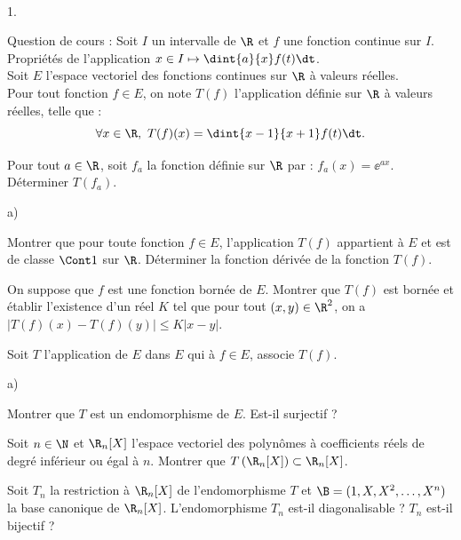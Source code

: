 \documentclass[11pt]{article}%
\begin{document}
\begin{exerciceAP}~
  \begin{noliste}{1.}
    \setlength{\itemsep}{2mm}
  \item Question de cours : Soit $I$ un intervalle de $\R$ et $f$ une
    fonction continue sur $I$.\\
    Propriétés de l'application $x \in I \mapsto \dint{a}{x} f(t)\dt$.\\
    Soit $E$ l'espace vectoriel des fonctions continues sur $\R$ à
    valeurs réelles.\\
    Pour tout fonction $f \in E$, on note $T(f)$ l'application définie
    sur $\R$ à valeurs réelles, telle que :
    \[
    \forall x\in\R, \ T(f)(x)=\dint{x-1}{x+1} f(t)\dt.
    \]
  \item Pour tout $a\in\R$, soit $f_a$ la fonction définie sur $\R$
    par : $f_a(x)=\ee^{ax}$. Déterminer $T(f_a)$.
  \item 
    \begin{noliste}{a)}
      \setlength{\itemsep}{2mm}
    \item Montrer que pour toute fonction $f\in E$, l'application
      $T(f)$ appartient à $E$ et est de classe $\Cont 1$ sur
      $\R$. Déterminer la fonction dérivée de la fonction $T(f)$.
    \item On suppose que $f$ est une fonction bornée de $E$. Montrer
      que $T(f)$ est bornée et établir l'existence d'un réel $K$ tel
      que pour tout $(x,y)\in\R^2$, on a $\vert T(f)(x)-T(f)(y)\vert
      \leq K \vert x-y\vert$.
    \end{noliste}

  \item Soit $T$ l'application de $E$ dans $E$ qui à $f\in E$, associe
    $T(f)$.
    \begin{noliste}{a)}
    \setlength{\itemsep}{2mm}
    \item Montrer que $T$ est un endomorphisme de $E$. Est-il
      surjectif ?
    \item Soit $n\in\N$ et $\R_n[X]$ l'espace vectoriel des polynômes
      à coefficients réels de degré inférieur ou égal à $n$. Montrer
      que $T\left( \R_n[X] \right) \subset \R_n[X]$.
    \item Soit $T_n$ la restriction à $\R_n[X]$ de l'endomorphisme $T$
      et $\B=(1,X,X^2,\hdots, X^n)$ la base canonique de $\R_n[X]$.
      L'endomorphisme $T_n$ est-il diagonalisable ? $T_n$ est-il
      bijectif ?
    \end{noliste}
  \end{noliste}
\end{exerciceAP}
\end{document}
